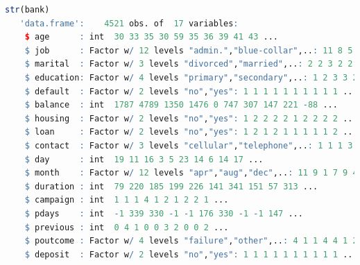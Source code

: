\documentclass[
]{book}
\theoremstyle{definition}
\theoremstyle{definition}
\theoremstyle{definition}
\theoremstyle{definition}
\theoremstyle{remark}
\begin{document}
\begin{lstlisting}[language=R]
str(bank)
   'data.frame':    4521 obs. of  17 variables:
    $ age      : int  30 33 35 30 59 35 36 39 41 43 ...
    $ job      : Factor w/ 12 levels "admin.","blue-collar",..: 11 8 5 5 2 5 7 10 3 8 ...
    $ marital  : Factor w/ 3 levels "divorced","married",..: 2 2 3 2 2 3 2 2 2 2 ...
    $ education: Factor w/ 4 levels "primary","secondary",..: 1 2 3 3 2 3 3 2 3 1 ...
    $ default  : Factor w/ 2 levels "no","yes": 1 1 1 1 1 1 1 1 1 1 ...
    $ balance  : int  1787 4789 1350 1476 0 747 307 147 221 -88 ...
    $ housing  : Factor w/ 2 levels "no","yes": 1 2 2 2 2 1 2 2 2 2 ...
    $ loan     : Factor w/ 2 levels "no","yes": 1 2 1 2 1 1 1 1 1 2 ...
    $ contact  : Factor w/ 3 levels "cellular","telephone",..: 1 1 1 3 3 1 1 1 3 1 ...
    $ day      : int  19 11 16 3 5 23 14 6 14 17 ...
    $ month    : Factor w/ 12 levels "apr","aug","dec",..: 11 9 1 7 9 4 9 9 9 1 ...
    $ duration : int  79 220 185 199 226 141 341 151 57 313 ...
    $ campaign : int  1 1 1 4 1 2 1 2 2 1 ...
    $ pdays    : int  -1 339 330 -1 -1 176 330 -1 -1 147 ...
    $ previous : int  0 4 1 0 0 3 2 0 0 2 ...
    $ poutcome : Factor w/ 4 levels "failure","other",..: 4 1 1 4 4 1 2 4 4 1 ...
    $ deposit  : Factor w/ 2 levels "no","yes": 1 1 1 1 1 1 1 1 1 1 ...
\end{lstlisting}
\end{document}
